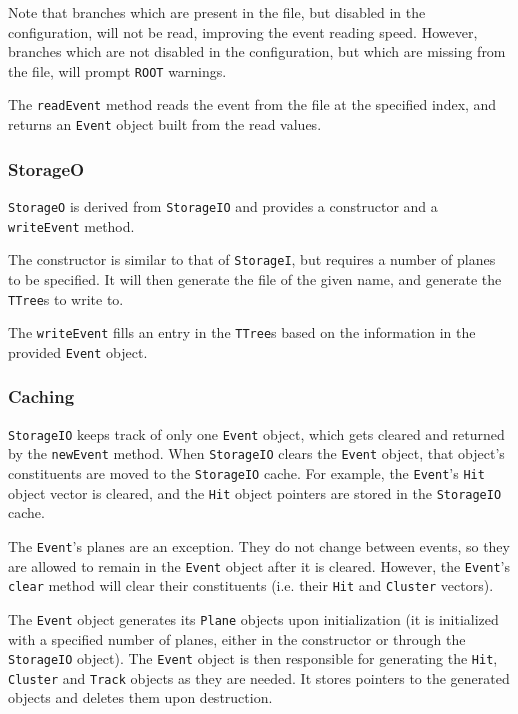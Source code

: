 \documentclass[10pt,a4paper]{book}
\newcommand{\ROOT}{\Verb`ROOT` }
\begin{document}
Note that branches which are present in the file, but disabled in the configuration, will not be read, improving the event reading speed. However, branches which are not disabled in the configuration, but which are missing from the file, will prompt \ROOT warnings.

The \Verb`readEvent` method reads the event from the file at the specified index, and returns an \Verb`Event` object built from the read values.

\subsubsection{StorageO}

\Verb`StorageO` is derived from \Verb`StorageIO` and provides a constructor and a \Verb`writeEvent` method.

The constructor is similar to that of \Verb`StorageI`, but requires a number of planes to be specified. It will then generate the file of the given name, and generate the \Verb`TTree`s to write to.

The \Verb`writeEvent` fills an entry in the \Verb`TTree`s based on the information in the provided \Verb`Event` object.

\subsubsection{Caching}

\Verb`StorageIO` keeps track of only one \Verb`Event` object, which gets cleared and returned by the \Verb`newEvent` method. When \Verb`StorageIO` clears the \Verb`Event` object, that object's constituents are moved to the \Verb`StorageIO` cache. For example, the \Verb`Event`'s \Verb`Hit` object vector is cleared, and the \Verb`Hit` object pointers are stored in the \Verb`StorageIO` cache.

The \Verb`Event`'s planes are an exception. They do not change between events, so they are allowed to remain in the \Verb`Event` object after it is cleared. However, the \Verb`Event`'s \Verb`clear` method will clear their constituents (i.e. their \Verb`Hit` and \Verb`Cluster` vectors).

The \Verb`Event` object generates its \Verb`Plane` objects upon initialization (it is initialized with a specified number of planes, either in the constructor or through the \Verb`StorageIO` object). The \Verb`Event` object is then responsible for generating the \Verb`Hit`, \Verb`Cluster` and \Verb`Track` objects as they are needed. It stores pointers to the generated objects and deletes them upon destruction.
\end{document}
